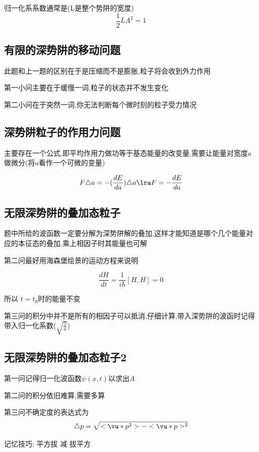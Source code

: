             归一化系系数通常是(L是整个势阱的宽度)
            $$ \frac{1}{2} L A^{2}  = 1 $$

        \subsection{有限的深势阱的移动问题}
            此题和上一题的区别在于是压缩而不是膨胀,粒子将会收到外力作用
            
            第一小问主要在于缓慢一词,粒子的状态并不发生变化
            
            第二小问在于突然一词,你无法判断每个微时刻的粒子受力情况

        \subsection{深势阱粒子的作用力问题}
            主要存在一个公式,即平均作用力做功等于基态能量的改变量,需要让能量对宽度$a$做微分(将$a$看作一个可微的变量)

            $$ F\triangle{a} = -(\frac{dE}{da}) \triangle{a} \lra F = -\frac{dE}{da} $$


        \subsection{无限深势阱的叠加态粒子}
            题中所给的波函数一定要分解为深势阱解的叠加,这样才能知道是哪个几个能量对应的本征态的叠加,乘上相因子时其能量也可解

            第二问最好用海森堡绘景的运动方程来说明

            $$ \frac{dH}{dt}  = \frac{1}{i\hbar} [H,H] = 0 $$
            
            所以 $ t = t_{0} $时的能量不变

            第三问的积分中并不是所有的相因子可以抵消,仔细计算,带入深势阱的波函时记得带入归一化系数($\sqrt{\frac{2}{a}}$)
            

        \subsection{无限深势阱的叠加态粒子2}
            第一问记得归一化波函数$\psi(x,t)$以求出$A$
            
            第二问的积分依旧难算,需要多算

            第三问不确定度的表达式为
            $$ \triangle{p} = \sqrt{<\vu*{p}^{2}> - <\vu*{p}>^{2} } $$

            记忆技巧: 平方拔 减 拔平方

